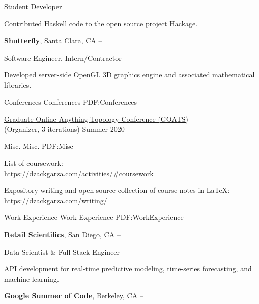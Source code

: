 \documentclass[letterpaper,MMMyyyy,nonstopmode]{simpleresumecv}
\begin{document}
\begin{Body}
\Gap
\BulletItem
Student Developer

\begin{Detail}
\SubBulletItem
Contributed Haskell code to the open source project Hackage.
\end{Detail}


\BigGap
\Entry
\href{http://www.shutterfly.com/}
{\textbf{Shutterfly}},
Santa Clara, CA
\hfill
{} --

\Gap
\BulletItem
Software Engineer, Intern/Contractor
\begin{Detail}
\SubBulletItem
Developed server-side OpenGL 3D graphics engine and associated mathematical libraries.
\end{Detail}



\Section
{Conferences}
{Conferences}
{PDF:Conferences}

\Gap
\BulletItem \href{https://dzackgarza.com/GOATS_2020/}{Graduate Online Anything Topology Conference (GOATS)} \\
(Organizer, 3 iterations)
\hfill Summer 2020


\Section
{Misc.}
{Misc.}
{PDF:Misc}

\BulletItem 
List of coursework: \\
\href{https://dzackgarza.com/activities/#coursework}{https://dzackgarza.com/activities/#coursework}

\BulletItem 
Expository writing and open-source collection of course notes in \LaTeX: \\
\href{https://dzackgarza.com/writing/}{https://dzackgarza.com/writing/}


\Section
{Work Experience}
{Work Experience}
{PDF:WorkExperience}

\Entry
\href{https://www.retailscientifics.com/}
{\textbf{Retail Scientifics}},
San Diego, CA
\hfill
{} --

\Gap
\BulletItem
Data Scientist \& Full Stack Engineer

\begin{Detail}
\SubBulletItem
API development for real-time predictive modeling, time-series forecasting, and machine learning.
\end{Detail}

\BigGap
\Entry
\href{https://summerofcode.withgoogle.com/archive/}
{\textbf{Google Summer of Code}},
Berkeley, CA
\hfill
{} --


\end{Body}
\end{document}
